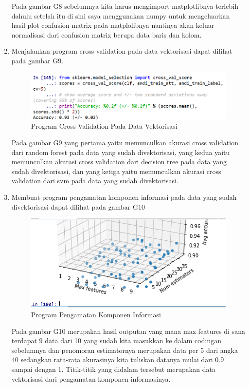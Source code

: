 \begin{enumerate}
\subitem Pada gambar G8 sebelumnya kita harus mengimport matplotlibnya terlebih dahulu setelah itu di sini saya 
 menggunakan numpy untuk mengeluarkan hasil plot confusion matrix pada matplolibnya nantinya akan keluar normalisasi dari  confusion matrix berupa data baris dan kolom. 
\item Menjalankan program cross validation pada data vektorisasi dapat dilihat pada gambar G9.
\begin{figure}[ht]
	\centerline{\includegraphics[width=1\textwidth]{figures/andi/G9.PNG}}
	\caption{Program Cross Validation Pada Data Vektorisasi}
	\label{Contoh Ilustrasi}
\end{figure}

\subitem Pada gambar G9 yang pertama yaitu memunculkan akurasi cross validation dari random forest pada data yang sudah divektorisasi, yang kedua yaitu memunculkan akurasi cross validation dari decision tree pada data yang sudah divektorisasi, dan yang ketiga yaitu memunculkan akurasi cross validation dari svm pada data yang sudah divektorisasi.
\item Membuat program pengamatan komponen informasi pada data yang sudah divektorisasi dapat dilihat pada gambar G10
\begin{figure}[ht]
	\centerline{\includegraphics[width=1\textwidth]{figures/andi/G10.PNG}}
	\caption{Program Pengamatan Komponen Informasi}
	\label{Contoh Ilustrasi}
\end{figure}

\subitem Pada gambar G10  merupakan hasil outputan yang mana max features di sana terdapat 9 data dari 10 yang sudah kita masukkan ke dalam codingan sebelumnya dan penomoran estimatornya merupakan data per 5 dari angka 40 sedangkan rata-rata akurasinya kita tuliskan datanya mulai dari 0.9 sampai dengan 1. Titik-titik yang didalam tersebut merupakan data vektorisasi dari pengamatan komponen informasinya.
\end{enumerate}

